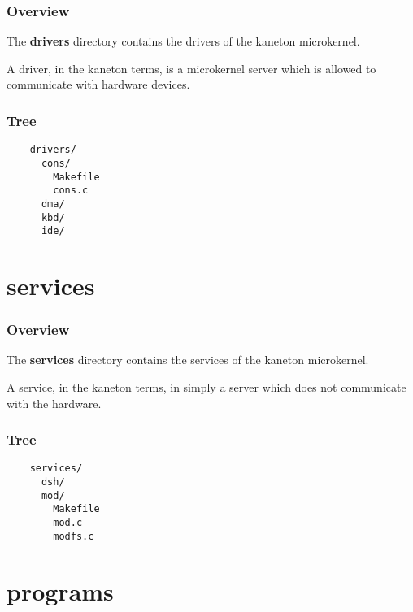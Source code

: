 
\begin{frame}
  \frametitle{Overview}

  The \textbf{drivers} directory contains the drivers of the kaneton
  microkernel.

  \nl

  A driver, in the kaneton terms, is a microkernel server which is allowed
  to communicate with hardware devices.
\end{frame}


\begin{frame}[containsverbatim]
  \frametitle{Tree}

  \begin{verbatim}
    drivers/
      cons/
        Makefile
        cons.c
      dma/
      kbd/
      ide/
  \end{verbatim}
\end{frame}

%
%

\section{services}


\begin{frame}
  \frametitle{Overview}

  The \textbf{services} directory contains the services of the kaneton
  microkernel.

  \nl

  A service, in the kaneton terms, in simply a server which does not
  communicate with the hardware.
\end{frame}


\begin{frame}[containsverbatim]
  \frametitle{Tree}

  \begin{verbatim}
    services/
      dsh/
      mod/
        Makefile
        mod.c
        modfs.c
  \end{verbatim}
\end{frame}

%
%

\section{programs}


